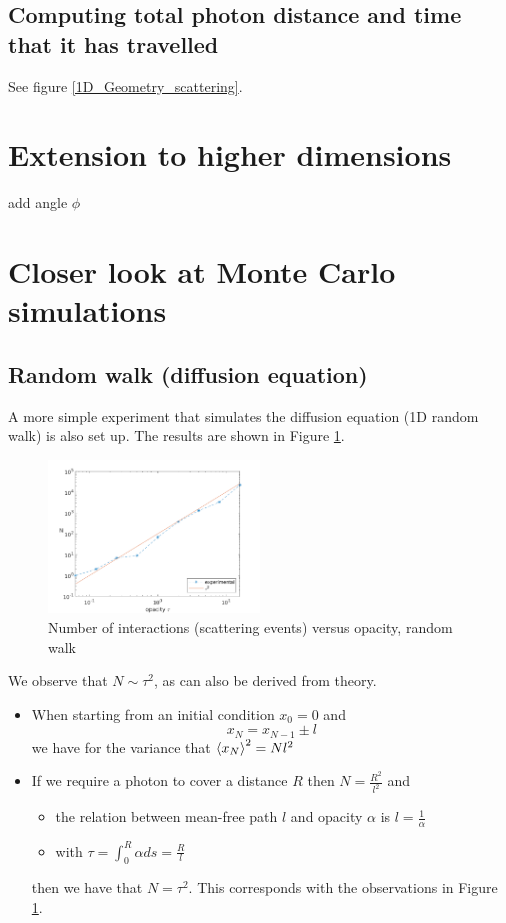 \documentclass[../main/main.tex]{subfiles}
\begin{document}
\subsection{Computing total photon distance and time that it has travelled}
See figure \ref{1D_Geometry_scattering}.

\newpage
\section{Extension to higher dimensions}
add angle $\phi$


\newpage
\section{Closer look at Monte Carlo simulations}
\label{diffusion_Monte_Carlo_mean_free_path}

\subsection{Random walk (diffusion equation)} A more simple experiment that simulates the diffusion equation (1D random walk) is also set up. The results are shown in Figure \ref{random_walk_N_vs_tau}.
	\begin{figure}[!htp]
	\centering
	\includegraphics[width=0.5\textwidth]{../../introductory_exercises/limb_darkening/data/diff_N_vs_opacity.png}
	\caption{Number of interactions (scattering events) versus 	opacity, random walk}
	\label{random_walk_N_vs_tau}
	\end{figure}
We observe that $N \sim \tau^2$, as can also be derived from theory.

\begin{itemize}
\item When starting from an initial condition $x_0 = 0$ and 
\begin{equation}
x_N = x_{N-1} \pm l
\end{equation}
we have for the variance that $\braket{x_N}^2 = N l^2$ 
\item If we require a photon to cover a distance $R$ then $N = \frac{R^2}{l^2}$ and
\begin{itemize}
\item the relation between mean-free path $l$ and opacity $\alpha$ is $l = \frac{1}{\alpha}$
\item with $\tau = \int_0^R \alpha ds = \frac{R}{l}$
\end{itemize}
then we have that $N = \tau^2$. This corresponds with the observations in Figure \ref{random_walk_N_vs_tau}.
\end{itemize}
\end{document}
